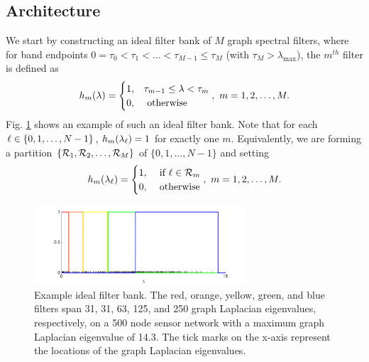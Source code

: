 \documentclass[journal, 10pt]{IEEEtran}
\begin{document}
\subsection{Architecture}
We start by constructing an ideal filter bank of $M$ graph spectral filters, where for %
band endpoints 
$0=\tau_0 < \tau_1 < \ldots < \tau_{M-1} \leq \tau_M$ (with $\tau_M > \lambda_{\max}$), the $m^{th}$ filter is defined as
\begin{align} \label{Eq:bandpass}
{h}_m(\lambda)=
\begin{cases}
1,& \tau_{m-1} \leq \lambda < \tau_m  \\
0,&\hbox{ otherwise}
\end{cases},~m=1,2,\ldots,M.
\end{align}
 Fig. \ref{Fig:fb} shows an example of such an ideal filter bank. Note that for each $\ell \in \{0,1,\ldots,N-1\}$, ${h}_m(\lambda_\ell)=1$ for exactly one $m$. 
Equivalently, we are forming a partition $\{{\cal R}_1,{\cal R}_2,\ldots,{\cal R}_M\}$ of $\{0,1,\ldots,N-1\}$ and setting
\begin{align*}
{h}_m(\lambda_{\l})=
\begin{cases}
1,&\hbox{ if } {\l} \in {\cal R}_m \\
0,&\hbox{ otherwise}
\end{cases},~m=1,2,\ldots,M.
\end{align*}

\begin{figure}[t]
\centerline{\includegraphics[width=3.1in]{fig_filter_bank}}
\caption{Example ideal filter bank. The red, orange, yellow, green, and blue filters span 31, 31, 63, 125, and 250 graph Laplacian eigenvalues, respectively, on a 500 node sensor network with %
a maximum graph Laplacian eigenvalue of 14.3. The tick marks on the x-axis represent the locations of the graph Laplacian eigenvalues.}\label{Fig:fb}
\end{figure}
\end{document}
